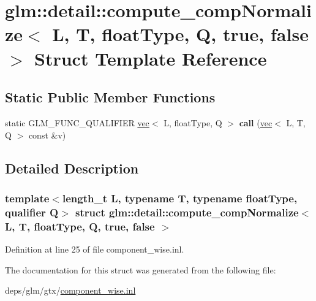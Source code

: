 \hypertarget{structglm_1_1detail_1_1compute__compNormalize_3_01L_00_01T_00_01floatType_00_01Q_00_01true_00_01false_01_4}{}\section{glm\+:\+:detail\+:\+:compute\+\_\+comp\+Normalize$<$ L, T, float\+Type, Q, true, false $>$ Struct Template Reference}
\label{structglm_1_1detail_1_1compute__compNormalize_3_01L_00_01T_00_01floatType_00_01Q_00_01true_00_01false_01_4}
\subsection*{Static Public Member Functions}
\begin{DoxyCompactItemize}
\item 
\mbox{\label{structglm_1_1detail_1_1compute__compNormalize_3_01L_00_01T_00_01floatType_00_01Q_00_01true_00_01false_01_4_a78d43a126b5ff756a41670dd6e0624d9}} 
static G\+L\+M\+\_\+\+F\+U\+N\+C\+\_\+\+Q\+U\+A\+L\+I\+F\+I\+ER \hyperlink{structglm_1_1vec}{vec}$<$ L, float\+Type, Q $>$ {\bfseries call} (\hyperlink{structglm_1_1vec}{vec}$<$ L, T, Q $>$ const \&v)
\end{DoxyCompactItemize}


\subsection{Detailed Description}
\subsubsection*{template$<$length\+\_\+t L, typename T, typename float\+Type, qualifier Q$>$\newline
struct glm\+::detail\+::compute\+\_\+comp\+Normalize$<$ L, T, float\+Type, Q, true, false $>$}



Definition at line 25 of file component\+\_\+wise.\+inl.



The documentation for this struct was generated from the following file\+:\begin{DoxyCompactItemize}
\item 
deps/glm/gtx/\hyperlink{component__wise_8inl}{component\+\_\+wise.\+inl}\end{DoxyCompactItemize}
